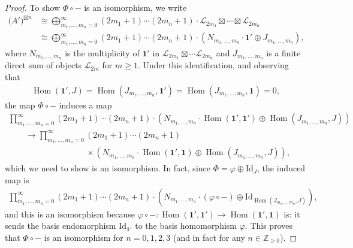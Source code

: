 \documentclass[pdftex]{sigma}
\numberwithin{equation}{section}
\theoremstyle{definition}
\begin{document}
\begin{proof}
To show $\Phi\circ -$ is an isomorphism, we write
\begin{align*}
\bigl(A'\bigr)^{\boxtimes n} & \cong\bigoplus_{m_1,\ldots,m_n=0}^\infty (2m_1+1)\cdots (2m_n+1)\cdot\mathcal{L}_{2m_1}\boxtimes\cdots\boxtimes\mathcal{L}_{2m_n} \nonumber\\
&\cong\bigoplus_{m_1,\ldots,m_n=0}^\infty (2m_1+1)\cdots (2m_n+1)\cdot(N_{m_1,\ldots,m_n}\cdot\mathbf{1}'\oplus J_{m_1,\ldots,m_n}),
\end{align*}
where $N_{m_1,\ldots,m_n}$ is the multiplicity of $\mathbf{1}'$ in $\mathcal{L}_{2m_1}\boxtimes\cdots\mathcal{L}_{2m_n}$ and $J_{m_1,\ldots,m_n}$ is a finite direct sum of objects $\mathcal{L}_{2m}$ for $m\geq 1$. Under this identification, and observing that
\begin{gather*}
\operatorname{Hom}(\mathbf{1}', J) = \operatorname{Hom}(J_{m_1,\ldots,m_n},\mathbf{1}')=\operatorname{Hom}(J_{m_1,\ldots,m_n},\mathbf{1})=0,
\end{gather*}
the map $\Phi\circ -$ induces a map
\begin{gather*}
\prod_{m_1,\ldots,m_n=0}^\infty (2m_1+1)\cdots (2m_n+1)\cdot (N_{m_1,\ldots,m_n}\cdot\operatorname{Hom}(\mathbf{1}',\mathbf{1}')\oplus\operatorname{Hom}(J_{m_1,\ldots,m_n},J))\\
\qquad\longrightarrow\prod_{m_1,\ldots,m_n=0}^\infty (2m_1+1)\cdots (2m_n+1)\\
\phantom{\qquad\longrightarrow\prod_{m_1,\ldots,m_n=0}^\infty }{}\times (N_{m_1,\ldots,m_n}\cdot\operatorname{Hom}(\mathbf{1}',\mathbf{1})\oplus\operatorname{Hom}(J_{m_1,\ldots,m_n},J)),
\end{gather*}
which we need to show is an isomorphism. In fact, since $\Phi=\varphi\oplus\mathrm{Id}_J$, the induced map is
\begin{gather*}
\prod_{m_1,\ldots,m_n=0}^\infty (2m_1+1)\cdots (2m_n+1)\cdot (N_{m_1,\ldots,m_n}\cdot(\varphi\circ-)\oplus\mathrm{Id}_{\operatorname{Hom}(J_{m_1,\ldots,m_n},J)}),
\end{gather*}
and this is an isomorphism because $\varphi\circ -\colon \operatorname{Hom}(\mathbf{1}',\mathbf{1}')\rightarrow\operatorname{Hom}(\mathbf{1}',\mathbf{1})$ is: it sends the basis endomorphism $\mathrm{Id}_{\mathbf{1}'}$ to the basis homomorphism $\varphi$. This proves that $\Phi\circ -$ is an isomorphism for $n=0,1,2,3$ (and in fact for any $n\in\mathbb{Z}_{\geq 0}$).



\end{proof}
\end{document}
